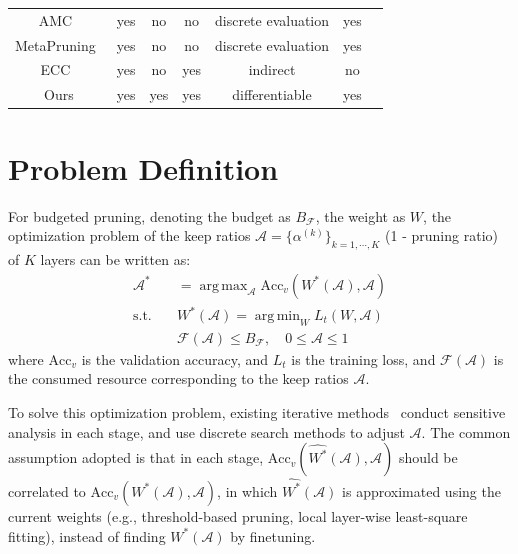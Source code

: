 \documentclass[runningheads]{llncs}
\newcommand{\flops}{\mathcal{F}}
\DeclareMathOperator*{\argmax}{arg\,max}
\DeclareMathOperator*{\argmin}{arg\,min}
\newcommand{\alphas}{\mathcal{A}}
\begin{document}
\begin{table}[bht]
\begin{tabular}{c|cccccc}
    AMC~\cite{amc}                       & yes & no  & no  & discrete evaluation  & yes \\
    MetaPruning~\cite{liu2019metapruning}& yes & no  & no  & discrete evaluation  & yes \\
    ECC~\cite{ecc}                       & yes & no  & yes & indirect             & no  \\\hline
    Ours                                 & yes & yes & yes & differentiable       & yes \\\hline
    \end{tabular}
  \end{table}
  


  \section{Problem Definition}
  \label{sec:pd}
  
  For budgeted pruning, denoting the budget as $B_\flops$, the weight as $W$, the optimization problem of the keep ratios $\alphas = \{\alpha^{(k)}\}_{k=1,\cdots,K}$ (1 - pruning ratio) of $K$ layers can be written as:
  \begin{equation}
    \begin{aligned}
      \alphas^{*} &= \argmax_{\alphas} \mbox{Acc}_v(W^*(\alphas), \alphas)\\
      \mbox{s.t.}\quad & W^*(\alphas) = \argmin_{W} L_t(W, \alphas)\\
      & \flops(\alphas) \leq B_\flops, \quad 0 \leq \alphas \leq 1
    \end{aligned}
    \label{eq:pd}
  \end{equation}
  where $\mbox{Acc}_v$ is the validation accuracy, and $L_t$ is the training loss, and $\flops(\alphas)$ is the consumed resource corresponding to the keep ratios $\alphas$.
  
  To solve this optimization problem, existing iterative methods~\cite{netadapt,amc,autocompress} conduct sensitive analysis in each stage, and use discrete search methods to adjust $\alphas$. The common assumption adopted is that in each stage, $\mbox{Acc}_v(\hat{W^*}(\alphas), \alphas)$ should be correlated to $\mbox{Acc}_v(W^*(\alphas), \alphas)$, in which $\hat{W^*}(\alphas)$ is approximated using the current weights (e.g., threshold-based pruning, local layer-wise least-square fitting), instead of finding $W^*(\alphas)$ by finetuning. 
  
\end{document}
